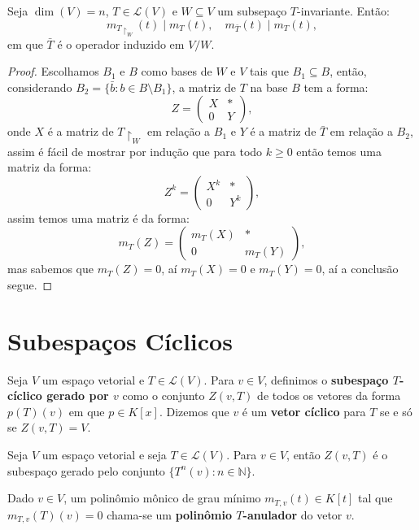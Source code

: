 \documentclass[11pt,twoside,a4paper]{book}
\begin{document}
\begin{lema}
Seja $\dim(V)=n$, $T\in\mathcal{L}(V)$ e $W\subseteq V$ um subsepaço $T$-invariante. Então:
\[
m_{T\upharpoonright_W}(t)\mid m_T(t),\quad m_{\bar{T}}(t)\mid m_T(t),
\]
em que $\bar{T}$ é o operador induzido em $V/W$.
\end{lema}
\begin{proof}
Escolhamos $B_1$ e $B$ como bases de $W$ e $V$ tais que $B_1\subseteq B$, então, considerando $B_2=\{\bar{b}:b\in B\setminus B_1\}$, a matriz de \(T\) na base \(B\) tem a forma:
\[Z=\begin{pmatrix}
X & * \\ 0 & Y\end{pmatrix},\]
onde $X$ é a matriz de $T\upharpoonright_W$ em relação a $B_1$ e $Y$ é a matriz de $\bar{T}$ em relação a $B_2$, assim é fácil de mostrar por indução que para todo $k\geq 0$ então temos uma matriz da forma:
\[
Z^k=
\begin{pmatrix}
X^k & * \\ 0 & Y^k
\end{pmatrix},
\]
assim temos uma matriz é da forma:
\[
m_T(Z)=
\begin{pmatrix}
m_T(X) & * \\ 0 & m_T(Y)
\end{pmatrix},
\]
mas sabemos que $m_T(Z)=0$, aí $m_T(X)=0$ e $m_T(Y)=0$, aí a conclusão segue.
\end{proof}

\section{Subespaços Cíclicos}

\begin{definicao}
Seja $V$ um espaço vetorial e $T\in\mathcal{L}(V)$. Para $v\in V$, definimos o \textbf{subespaço $T$-cíclico gerado por $v$} como o conjunto $Z(v,T)$ de todos os vetores da forma $p(T)(v)$ em que $p\in K[x]$. Dizemos que $v$ é um \textbf{vetor cíclico} para $T$ se e só se $Z(v,T)=V$.
\end{definicao}

\begin{proposicao}
Seja $V$ um espaço vetorial e seja $T\in\mathcal{L}(V)$. Para $v\in V$, então $Z(v,T)$ é o subespaço gerado pelo conjunto $\{T^n(v):n\in\mathbb{N}\}$.
\end{proposicao}

\begin{definicao}
Dado $v\in V$, um polinômio mônico de grau mínimo $m_{T,v}(t)\in K[t]$ tal que $m_{T,v}(T)(v)=0$ chama-se um \textbf{polinômio $T$-anulador} do vetor $v$.
\end{definicao}
\end{document}
